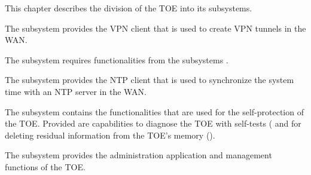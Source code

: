 

This chapter describes the division of the TOE into its subsystems.



The subsystem  provides the VPN client that is used to create VPN tunnels in the WAN.




The subsystem  requires functionalities from the subsystems
.




The subsystem  provides the NTP client that is used to
synchronize the system time with an NTP server in the WAN.






The subsystem  contains the functionalities that are used
for the self-protection of the TOE. Provided are capabilities to diagnose the
TOE with self-tests ( and for deleting
residual information from the TOE's memory ().






The subsystem  provides the administration application and
management functions of the TOE.



